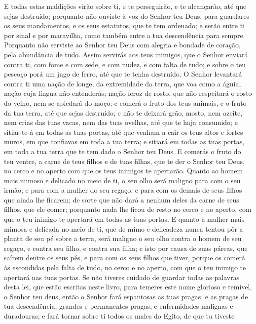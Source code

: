 E todas estas maldições virão sobre ti, e te perseguirão, e te
alcançarão, até que sejas destruído; porquanto não ouviste à voz do
Senhor teu Deus, para guardares os seus mandamentos, e os seus
estatutos, que te tem ordenado; e serão entre ti por sinal e
por maravilha, como também entre a tua descendência para sempre.
Porquanto não serviste ao Senhor teu Deus com alegria e
bondade de coração, pela abundância de tudo. Assim servirás
aos teus inimigos, que o Senhor enviará contra ti, com fome e com
sede, e com nudez, e com falta de tudo; e sobre o teu pescoço porá
um jugo de ferro, até que te tenha destruído. O Senhor
levantará contra ti uma nação de longe, da extremidade da terra, que
voa como a águia, nação cuja língua não entenderás; nação
feroz de rosto, que não respeitará o rosto do velho, nem se apiedará
do moço; e comerá o fruto dos teus animais, e o fruto da tua
terra, até que sejas destruído; e não te deixará grão, mosto, nem
azeite, nem crias das tuas vacas, nem das tuas ovelhas, até que te
haja consumido; e sitiar-te-á em todas as tuas portas, até
que venham a cair os teus altos e fortes muros, em que confiavas em
toda a tua terra; e sitiará em todas as tuas portas, em toda a tua
terra que te tem dado o Senhor teu Deus. E comerás o fruto do
teu ventre, a carne de teus filhos e de tuas filhas, que te der o
Senhor teu Deus, no cerco e no aperto com que os teus inimigos te
apertarão. Quanto ao homem mais mimoso e delicado no meio de
ti, o seu olho será maligno para com o seu irmão, e para com a
mulher do seu regaço, e para com os demais de seus filhos que ainda
lhe ficarem; de sorte que não dará a nenhum deles da carne de
seus filhos, que ele comer; porquanto nada lhe ficou de resto no
cerco e no aperto, com que o teu inimigo te apertará em todas as
tuas portas. E quanto à mulher mais mimosa e delicada no meio
de ti, que de mimo e delicadeza nunca tentou pôr a planta de seu pé
sobre a terra, será maligno o seu olho contra o homem de seu regaço,
e contra seu filho, e contra sua filha; e isto por causa de
suas páreas, que saírem dentre os seus pés, e para com os seus
filhos que tiver, porque os comerá às escondidas pela falta de tudo,
no cerco e no aperto, com que o teu inimigo te apertará nas tuas
portas. Se não tiveres cuidado de guardar todas as palavras
desta lei, que estão escritas neste livro, para temeres este nome
glorioso e temível, o Senhor teu deus, então o Senhor fará
espantosas as tuas pragas, e as pragas de tua descendência, grandes
e permanentes pragas, e enfermidades malignas e duradouras; e
fará tornar sobre ti todos os males do Egito, de que tu tiveste
